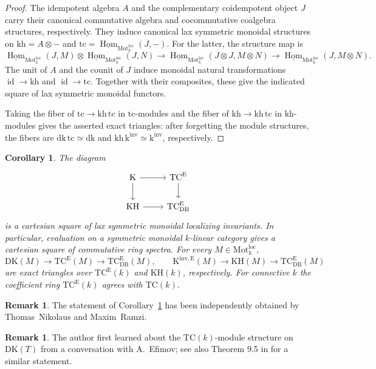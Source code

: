 \documentclass{amsart}
\theoremstyle{plain}
\newtheorem{corollary}[prop]{Corollary}
\theoremstyle{definition}
\newtheorem{remark}[prop]{Remark}
\newcommand{\Motloc}{\mathrm{Mot}^{\mathrm{loc}}}
\newcommand{\TC}{\mathrm{TC}}
\newcommand{\K}{\mathrm{K}}
\newcommand{\KH}{\mathrm{KH}}
\newcommand{\DK}{\mathrm{DK}}
\newcommand{\dk}{\mathrm{dk}}
\newcommand{\kh}{\mathrm{kh}}
\newcommand{\tc}{\mathrm{tc}}
\newcommand{\kinv}{\mathrm{k}^{\mathrm{inv}}}
\DeclareMathOperator{\Hom}{Hom}
\DeclareMathOperator{\id}{id}
\newcommand{\DB}{\mathrm{DB}}
\begin{document}
\begin{proof}
The idempotent algebra $A$ and the complementary coidempotent object $J$ carry their canonical commutative algebra and cocommutative coalgebra structures, respectively. They induce canonical lax symmetric monoidal structures on
$\kh=A\otimes-$ and $\tc=\underline{\Hom}_{\Motloc_k}(J,-)$.
For the latter, the
structure map is
\[
\underline{\Hom}_{\Motloc_k}(J,M)\otimes
\underline{\Hom}_{\Motloc_k}(J,N)
\longrightarrow
\underline{\Hom}_{\Motloc_k}(J\otimes J,M\otimes N)
\longrightarrow
\underline{\Hom}_{\Motloc_k}(J,M\otimes N).
\]
The unit of $A$ and the counit of $J$ induce monoidal natural transformations $\id\to \kh$ and $\id\to \tc$.
Together with their composites, these give the indicated square of lax symmetric monoidal functors.

Taking the fiber of $\tc\to \kh\,\tc$ in $\tc$-modules and the fiber of $\kh\to \kh\,\tc$ in $\kh$-modules gives the asserted exact triangles: after forgetting the module structures, the fibers are
$\dk\,\tc\simeq \dk$ and
$\kh\,\kinv\simeq \kinv$, respectively.
\end{proof}





\begin{corollary}\label{multiplicativeinvariants}
The diagram
\[
\begin{tikzcd}
\K\arrow[r]\arrow[d]&\TC^{\mathrm{E}}\arrow[d]\\
\KH\arrow[r]&\TC^{\mathrm{E}}_{\DB}
\end{tikzcd}
\]
is a cartesian square of lax symmetric monoidal localizing invariants. In particular, evaluation on a symmetric monoidal $k$-linear category gives a cartesian square of commutative ring spectra. For every $M\in\Motloc_k$,
\[
\DK(M)\longrightarrow \TC^{\mathrm{E}}(M)\longrightarrow \TC^{\mathrm{E}}_{\DB}(M),\qquad
\K^{\mathrm{inv},\mathrm{E}}(M)\longrightarrow \KH(M)\longrightarrow \TC^{\mathrm{E}}_{\DB}(M)
\]
are exact triangles over $\TC^{\mathrm{E}}(k)$ and $\KH(k)$, respectively.
For connective $k$ the coefficient ring $\TC^{\mathrm{E}}(k)$ agrees with $\TC(k)$.
\end{corollary}

\begin{remark}
The statement of Corollary~\ref{multiplicativeinvariants} has  been independently obtained by Thomas~Nikolaus and Maxim~Ramzi. 
\end{remark}

\begin{remark}
The author first learned about the $\TC(k)$-module structure on $\DK(T)$ from a conversation with A.~Efimov; see also Theorem 9.5 in \cite{Efi25b} for a similar statement.
\end{remark}
\end{document}
